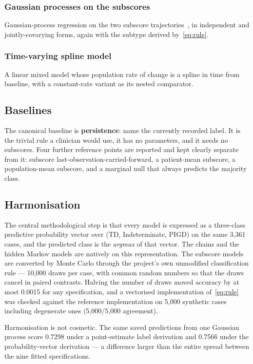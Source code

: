 \documentclass[journal]{IEEEtran}
\begin{document}
\subsubsection{Gaussian processes on the subscores}
Gaussian-process regression on the two subscore trajectories~\cite{rasmussen2006},
in independent and jointly-covarying forms, again with the subtype derived
by~\eqref{eq:rule}.

\subsubsection{Time-varying spline model}
A linear mixed model whose population rate of change is a spline in time from
baseline, with a constant-rate variant as its nested comparator.

\subsection{Baselines}
The canonical baseline is \textbf{persistence}: name the currently recorded
label. It is the trivial rule a clinician would use, it has no parameters, and
it needs no subscores. Four further reference points are reported and kept
clearly separate from it: subscore last-observation-carried-forward, a
patient-mean subscore, a population-mean subscore, and a marginal null that
always predicts the majority class.

\subsection{Harmonisation}
\label{sec:harmonisation}
The central methodological step is that every model is expressed as a
three-class predictive probability vector over (TD, Indeterminate, PIGD) on the
same 3,361 cases, and the predicted class is the \emph{argmax} of that vector.
The chains and the hidden Markov models are natively on this representation.
The subscore models are converted by Monte Carlo through the project's own
unmodified classification rule --- 10,000 draws per case, with common random
numbers so that the draws cancel in paired contrasts. Halving the number of
draws moved accuracy by at most 0.0015 for any specification, and a vectorised
implementation of~\eqref{eq:rule} was checked against the reference
implementation on 5,000 synthetic cases including degenerate ones
(5,000/5,000 agreement).

Harmonisation is not cosmetic. The same saved predictions from one Gaussian
process score 0.7298 under a point-estimate label derivation and 0.7566 under
the probability-vector derivation --- a difference larger than the entire spread
between the nine fitted specifications.
\end{document}
